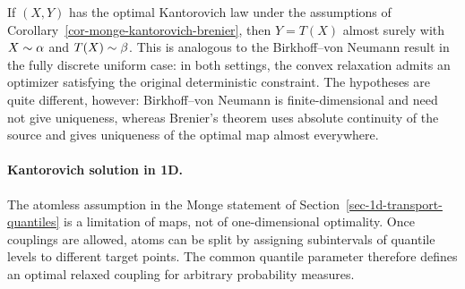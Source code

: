 \begin{rem}
	If $(X,Y)$ has the optimal Kantorovich law under the assumptions of Corollary~\ref{cor-monge-kantorovich-brenier}, then $Y=T(X)$ almost surely with $X\sim\alpha$ and $T(X)\sim\beta$. This is analogous to the Birkhoff--von Neumann result in the fully discrete uniform case: in both settings, the convex relaxation admits an optimizer satisfying the original deterministic constraint. The hypotheses are quite different, however: Birkhoff--von Neumann is finite-dimensional and need not give uniqueness, whereas Brenier's theorem uses absolute continuity of the source and gives uniqueness of the optimal map almost everywhere.
\end{rem}

\paragraph{Kantorovich solution in 1D.}\label{sec-1d-kantorovich-solution}

The atomless assumption in the Monge statement of Section~\ref{sec-1d-transport-quantiles} is a limitation of maps, not of one-dimensional optimality. Once couplings are allowed, atoms can be split by assigning subintervals of quantile levels to different target points. The common quantile parameter therefore defines an optimal relaxed coupling for arbitrary probability measures.

